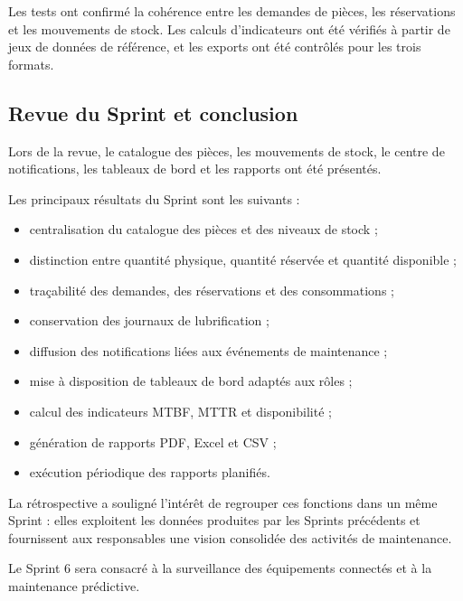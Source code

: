Les tests ont confirmé la cohérence entre les demandes de pièces, les réservations et les mouvements de stock. Les calculs d'indicateurs ont été vérifiés à partir de jeux de données de référence, et les exports ont été contrôlés pour les trois formats.

\subsection{Revue du Sprint et conclusion}
\enlargethispage{2\baselineskip}

Lors de la revue, le catalogue des pièces, les mouvements de stock, le centre de notifications, les tableaux de bord et les rapports ont été présentés.

Les principaux résultats du Sprint sont les suivants :

\begin{itemize}
    \item centralisation du catalogue des pièces et des niveaux de stock ;
    \item distinction entre quantité physique, quantité réservée et quantité disponible ;
    \item traçabilité des demandes, des réservations et des consommations ;
    \item conservation des journaux de lubrification ;
    \item diffusion des notifications liées aux événements de maintenance ;
    \item mise à disposition de tableaux de bord adaptés aux rôles ;
    \item calcul des indicateurs MTBF, MTTR et disponibilité ;
    \item génération de rapports PDF, Excel et CSV ;
    \item exécution périodique des rapports planifiés.
\end{itemize}

La rétrospective a souligné l'intérêt de regrouper ces fonctions dans un même Sprint : elles exploitent les données produites par les Sprints précédents et fournissent aux responsables une vision consolidée des activités de maintenance.

Le Sprint 6 sera consacré à la surveillance des équipements connectés et à la maintenance prédictive.